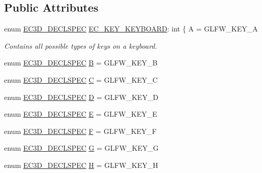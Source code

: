 \subsection*{Public Attributes}
\begin{DoxyCompactItemize}
\item 
enum \mbox{\hyperlink{_common_8h_aac42573e202ca3dd4d259c81691e2369}{E\+C3\+D\+\_\+\+D\+E\+C\+L\+S\+P\+EC}} \mbox{\hyperlink{classec_1_1_keyboard_a135ca08df15aebf8c93ce3cc76288a6e}{E\+C\+\_\+\+K\+E\+Y\+\_\+\+K\+E\+Y\+B\+O\+A\+RD}}\+: int \{ A = G\+L\+F\+W\+\_\+\+K\+E\+Y\+\_\+A
\begin{DoxyCompactList}\small\item\em Contains all possible types of keys on a keyboard. \end{DoxyCompactList}\item 
enum \mbox{\hyperlink{_common_8h_aac42573e202ca3dd4d259c81691e2369}{E\+C3\+D\+\_\+\+D\+E\+C\+L\+S\+P\+EC}} \mbox{\hyperlink{classec_1_1_keyboard_a10567c2f907d921b438ca4f96e7dfb86}{B}} = G\+L\+F\+W\+\_\+\+K\+E\+Y\+\_\+B
\item 
enum \mbox{\hyperlink{_common_8h_aac42573e202ca3dd4d259c81691e2369}{E\+C3\+D\+\_\+\+D\+E\+C\+L\+S\+P\+EC}} \mbox{\hyperlink{classec_1_1_keyboard_afdb55905c629366fca7f4b8b342d7925}{C}} = G\+L\+F\+W\+\_\+\+K\+E\+Y\+\_\+C
\item 
enum \mbox{\hyperlink{_common_8h_aac42573e202ca3dd4d259c81691e2369}{E\+C3\+D\+\_\+\+D\+E\+C\+L\+S\+P\+EC}} \mbox{\hyperlink{classec_1_1_keyboard_ab15bf9e1970fea6d05ec91687089dff1}{D}} = G\+L\+F\+W\+\_\+\+K\+E\+Y\+\_\+D
\item 
enum \mbox{\hyperlink{_common_8h_aac42573e202ca3dd4d259c81691e2369}{E\+C3\+D\+\_\+\+D\+E\+C\+L\+S\+P\+EC}} \mbox{\hyperlink{classec_1_1_keyboard_a95903eac785cffca940c056b1c7c70a3}{E}} = G\+L\+F\+W\+\_\+\+K\+E\+Y\+\_\+E
\item 
enum \mbox{\hyperlink{_common_8h_aac42573e202ca3dd4d259c81691e2369}{E\+C3\+D\+\_\+\+D\+E\+C\+L\+S\+P\+EC}} \mbox{\hyperlink{classec_1_1_keyboard_a60c5617a98a4b1ff360ccd1c4fd48251}{F}} = G\+L\+F\+W\+\_\+\+K\+E\+Y\+\_\+F
\item 
enum \mbox{\hyperlink{_common_8h_aac42573e202ca3dd4d259c81691e2369}{E\+C3\+D\+\_\+\+D\+E\+C\+L\+S\+P\+EC}} \mbox{\hyperlink{classec_1_1_keyboard_a7956c29b83bc5d7bf3b1f5f4b806fb50}{G}} = G\+L\+F\+W\+\_\+\+K\+E\+Y\+\_\+G
\item 
enum \mbox{\hyperlink{_common_8h_aac42573e202ca3dd4d259c81691e2369}{E\+C3\+D\+\_\+\+D\+E\+C\+L\+S\+P\+EC}} \mbox{\hyperlink{classec_1_1_keyboard_a58c938acd086ad64b49a1359dfb25e0b}{H}} = G\+L\+F\+W\+\_\+\+K\+E\+Y\+\_\+H

\end{DoxyCompactItemize}
